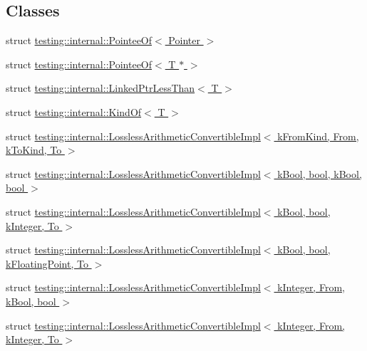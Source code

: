 \subsection*{Classes}
\begin{DoxyCompactItemize}
\item 
struct \hyperlink{structtesting_1_1internal_1_1_pointee_of}{testing\+::internal\+::\+Pointee\+Of$<$ Pointer $>$}
\item 
struct \hyperlink{structtesting_1_1internal_1_1_pointee_of_3_01_t_01_5_01_4}{testing\+::internal\+::\+Pointee\+Of$<$ T $\ast$ $>$}
\item 
struct \hyperlink{structtesting_1_1internal_1_1_linked_ptr_less_than}{testing\+::internal\+::\+Linked\+Ptr\+Less\+Than$<$ T $>$}
\item 
struct \hyperlink{structtesting_1_1internal_1_1_kind_of}{testing\+::internal\+::\+Kind\+Of$<$ T $>$}
\item 
struct \hyperlink{structtesting_1_1internal_1_1_lossless_arithmetic_convertible_impl}{testing\+::internal\+::\+Lossless\+Arithmetic\+Convertible\+Impl$<$ k\+From\+Kind, From, k\+To\+Kind, To $>$}
\item 
struct \hyperlink{structtesting_1_1internal_1_1_lossless_arithmetic_convertible_impl_3_01k_bool_00_01bool_00_01k_bool_00_01bool_01_4}{testing\+::internal\+::\+Lossless\+Arithmetic\+Convertible\+Impl$<$ k\+Bool, bool, k\+Bool, bool $>$}
\item 
struct \hyperlink{structtesting_1_1internal_1_1_lossless_arithmetic_convertible_impl_3_01k_bool_00_01bool_00_01k_integer_00_01_to_01_4}{testing\+::internal\+::\+Lossless\+Arithmetic\+Convertible\+Impl$<$ k\+Bool, bool, k\+Integer, To $>$}
\item 
struct \hyperlink{structtesting_1_1internal_1_1_lossless_arithmetic_convertible_impl_3_01k_bool_00_01bool_00_01k_floating_point_00_01_to_01_4}{testing\+::internal\+::\+Lossless\+Arithmetic\+Convertible\+Impl$<$ k\+Bool, bool, k\+Floating\+Point, To $>$}
\item 
struct \hyperlink{structtesting_1_1internal_1_1_lossless_arithmetic_convertible_impl_3_01k_integer_00_01_from_00_01k_bool_00_01bool_01_4}{testing\+::internal\+::\+Lossless\+Arithmetic\+Convertible\+Impl$<$ k\+Integer, From, k\+Bool, bool $>$}
\item 
struct \hyperlink{structtesting_1_1internal_1_1_lossless_arithmetic_convertible_impl_3_01k_integer_00_01_from_00_01k_integer_00_01_to_01_4}{testing\+::internal\+::\+Lossless\+Arithmetic\+Convertible\+Impl$<$ k\+Integer, From, k\+Integer, To $>$}

\end{DoxyCompactItemize}
